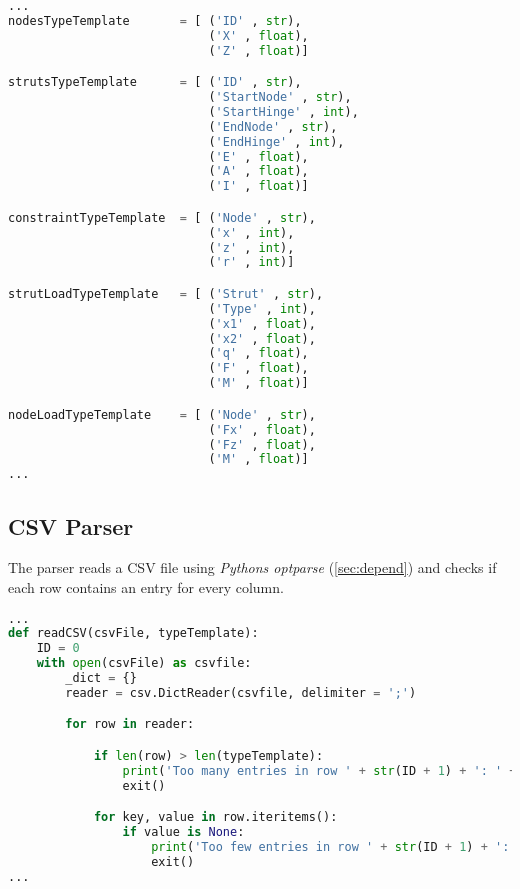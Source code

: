 \begin{inconsolata}
\begin{minipage}{\linewidth}
\begin{lstlisting}[language=python]
...
nodesTypeTemplate       = [ ('ID' , str),
                            ('X' , float),
                            ('Z' , float)]

strutsTypeTemplate      = [ ('ID' , str),
                            ('StartNode' , str),
                            ('StartHinge' , int),
                            ('EndNode' , str),
                            ('EndHinge' , int),
                            ('E' , float),
                            ('A' , float),
                            ('I' , float)]

constraintTypeTemplate  = [ ('Node' , str),
                            ('x' , int),
                            ('z' , int),
                            ('r' , int)]

strutLoadTypeTemplate   = [ ('Strut' , str),
                            ('Type' , int),
                            ('x1' , float),
                            ('x2' , float),
                            ('q' , float),
                            ('F' , float),
                            ('M' , float)]

nodeLoadTypeTemplate    = [ ('Node' , str),
                            ('Fx' , float),
                            ('Fz' , float),
                            ('M' , float)]
...
\end{lstlisting}
\end{minipage}
\end{inconsolata}

\pagebreak

\subsection{CSV Parser}
\label{sec:csvparse}

The parser reads a CSV file using \textit{Pythons optparse} (\ref{sec:depend}) and checks if each row contains an entry for every column.

\begin{inconsolata}
\begin{minipage}{\linewidth}
\begin{lstlisting}[language=python]
...
def readCSV(csvFile, typeTemplate):
    ID = 0
    with open(csvFile) as csvfile:
        _dict = {}
        reader = csv.DictReader(csvfile, delimiter = ';')

        for row in reader:

            if len(row) > len(typeTemplate):
                print('Too many entries in row ' + str(ID + 1) + ': ' + csvFile)
                exit()

            for key, value in row.iteritems():
                if value is None:
                    print('Too few entries in row ' + str(ID + 1) + ': ' + csvFile)
                    exit()
...
\end{lstlisting}
\end{minipage}
\end{inconsolata}

